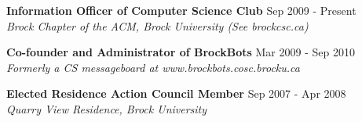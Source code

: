 \documentclass[margin]{res}
\begin{document}
\begin{resume}
  \textbf{Information Officer of Computer Science Club} \hfill Sep 2009 - Present \\
    {\sl Brock Chapter of the ACM, Brock University (See brockcsc.ca)}


  \textbf{Co-founder and Administrator of BrockBots} \hfill Mar 2009 - Sep 2010 \\
    {\sl Formerly a CS messageboard at www.brockbots.cosc.brocku.ca}
    

  \textbf{Elected Residence Action Council Member} \hfill Sep 2007 - Apr 2008 \\
    {\sl Quarry View Residence, Brock University}
 

\end{resume}
\end{document}
